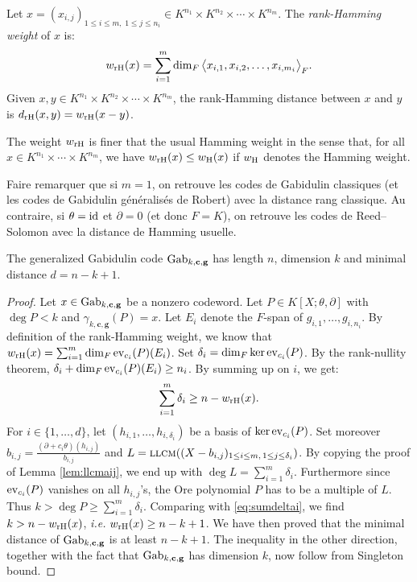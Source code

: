 \documentclass[a4paper]{llncs}
\def\todo#1{{\color{todo} #1}}
\newcommand{\id}{\textrm{\rm id}}
\newcommand{\ev}[1]{\textrm{\rm ev}_{#1}}
\newcommand{\llcm}{\textsc{llcm}}
\newcommand{\bc}{\textbf{c}}
\newcommand{\bg}{\textbf{g}}
\newcommand{\Gab}{\textrm{\rm Gab}}
\newcommand{\wH}{w_{\textrm{\rm H}}}
\newcommand{\wrH}{w_{\textrm{\rm rH}}}
\newcommand{\drH}{d_{\textrm{\rm rH}}}
\begin{document}
\begin{definition}%
Let $x = (x_{i,j})_{1 \leq i \leq m, \; 1 \leq j \leq n_i} \in
K^{n_1} \times K^{n_2} \times \cdots \times K^{n_m}$.
The \emph{rank-Hamming weight} of $x$ is:
$$\wrH(x) = 
\sum_{i=1}^m \dim_F \big< x_{i,1}, x_{i,2}, \ldots, x_{i,{m_i}} \big>_F.$$
Given $x, y \in K^{n_1} \times K^{n_2} \times \cdots \times K^{n_m}$, 
the {rank-Hamming distance} between $x$ and $y$ is $\drH(x,y) = 
\wrH(x-y)$.
\end{definition}

\begin{remark}
The weight $\wrH$ is finer that the usual Hamming weight in the 
sense that, for all $x \in K^{n_1} \times \cdots \times K^{n_m}$, 
we have $\wrH(x) \leq \wH(x)$ if $\wH$ denotes the Hamming weight.
\end{remark}

\todo{Faire remarquer que si $m = 1$, on retrouve les codes de 
Gabidulin classiques (et les codes de Gabidulin généralisés de Robert)
avec la distance rang classique.
Au contraire, si $\theta = \id$ et $\partial = 0$ (et donc $F = K$),
on retrouve les codes de Reed--Solomon avec la distance de Hamming
usuelle.}

\begin{proposition}
The generalized Gabidulin code $\Gab_{k,\bc,\bg}$ has length $n$,
dimension $k$ and minimal distance $d = n - k + 1$.
\end{proposition}

\begin{proof}
Let $x \in \Gab_{k,\bc,\bg}$ be a nonzero codeword. Let $P \in 
K[X;\theta,\partial]$ with $\deg P < k$ and $\gamma_{k,\bc,\bg}(P) = x$.
Let $E_i$ denote the $F$-span of $g_{i,1}, \ldots, g_{i,n_i}$. By
definition of the rank-Hamming weight, we know that
$\wrH(x) = \sum_{i=1}^m \dim_F \ev{c_i}(P)(E_i)$.
Set $\delta_i = \dim_F \ker \ev{c_i}(P)$. By the rank-nullity
theorem, $\delta_i + \dim_F \ev{c_i}(P)(E_i) \geq n_i$. By summing
up on $i$, we get:
\begin{equation}
\label{eq:sumdeltai}
\sum_{i=1}^m \delta_i \geq n - \wrH(x).
\end{equation}
For $i \in \{1,\ldots,d\}$, let $(h_{i,1}, \ldots, h_{i,\delta_i})$
be a basis of $\ker \ev{c_i}(P)$. 
Set moreover $b_{i,j} = \frac{(\partial + c_i\theta)(h_{i,j})}{b_{i,j}}$
and $L = \llcm((X - b_{i,j})_{1 \leq i \leq m, \, 1 \leq j \leq \delta_i})$.
By copying the proof of Lemma \ref{lem:llcmaij}, we end up with
$\deg L = \sum_{i=1}^m \delta_i$. Furthermore since $\ev{c_i}(P)$
vanishes on all $h_{i,j}$'s, the Ore polynomial $P$ has to be a 
multiple of $L$. Thus $k > \deg P \geq \sum_{i=1}^m \delta_i$.
Comparing with \eqref{eq:sumdeltai}, we find $k > n - \wrH(x)$,
\emph{i.e.} $\wrH(x) \geq n - k + 1$.
We have then proved that the minimal distance of $\Gab_{k,\bc,\bg}$
is at least $n - k + 1$.
The inequality in the other direction, together with the fact that
$\Gab_{k,\bc,\bg}$ has dimension $k$, now follow from Singleton bound.
\end{proof}
\end{document}
